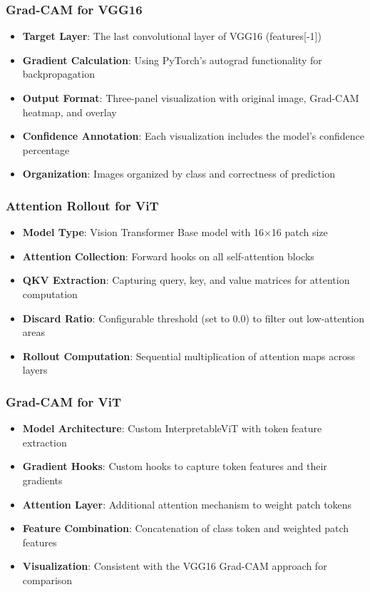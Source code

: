 \documentclass[a4paper,12pt]{article}
\begin{document}
\subsubsection{Grad-CAM for VGG16}
\begin{itemize}
    \item \textbf{Target Layer}: The last convolutional layer of VGG16 (features[-1])
    \item \textbf{Gradient Calculation}: Using PyTorch's autograd functionality for backpropagation
    \item \textbf{Output Format}: Three-panel visualization with original image, Grad-CAM heatmap, and overlay
    \item \textbf{Confidence Annotation}: Each visualization includes the model's confidence percentage
    \item \textbf{Organization}: Images organized by class and correctness of prediction
\end{itemize}

\subsubsection{Attention Rollout for ViT}
\begin{itemize}
    \item \textbf{Model Type}: Vision Transformer Base model with 16×16 patch size
    \item \textbf{Attention Collection}: Forward hooks on all self-attention blocks
    \item \textbf{QKV Extraction}: Capturing query, key, and value matrices for attention computation
    \item \textbf{Discard Ratio}: Configurable threshold (set to 0.0) to filter out low-attention areas
    \item \textbf{Rollout Computation}: Sequential multiplication of attention maps across layers
\end{itemize}

\subsubsection{Grad-CAM for ViT}
\begin{itemize}
    \item \textbf{Model Architecture}: Custom InterpretableViT with token feature extraction
    \item \textbf{Gradient Hooks}: Custom hooks to capture token features and their gradients
    \item \textbf{Attention Layer}: Additional attention mechanism to weight patch tokens
    \item \textbf{Feature Combination}: Concatenation of class token and weighted patch features
    \item \textbf{Visualization}: Consistent with the VGG16 Grad-CAM approach for comparison
\end{itemize}
\end{document}
